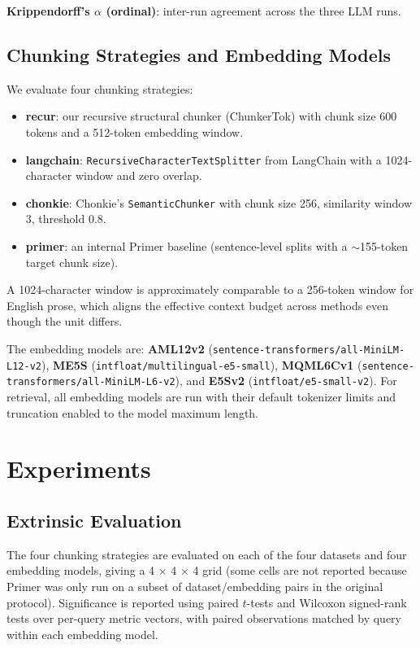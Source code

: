 \documentclass[conference]{IEEEtran}
\begin{document}
\textbf{Krippendorff's $\alpha$ (ordinal)}: inter-run agreement across the
three LLM runs.

\subsection{Chunking Strategies and Embedding Models}

We evaluate four chunking strategies:
\begin{itemize}
    \item \textbf{recur}: our recursive structural chunker (ChunkerTok)
    with chunk size 600 tokens and a 512-token embedding window.
    \item \textbf{langchain}: \texttt{RecursiveCharacterTextSplitter} from
    LangChain with a 1024-character window and zero overlap.
    \item \textbf{chonkie}: Chonkie's \texttt{SemanticChunker} with chunk
    size 256, similarity window 3, threshold 0.8.
    \item \textbf{primer}: an internal Primer baseline (sentence-level
    splits with a $\sim$155-token target chunk size).
\end{itemize}
A 1024-character window is approximately comparable to a 256-token window
for English prose, which aligns the effective context budget across methods
even though the unit differs.

The embedding models are:
\textbf{AML12v2} (\texttt{sentence-transformers/all-MiniLM-L12-v2}),
\textbf{ME5S} (\texttt{intfloat/multilingual-e5-small}),
\textbf{MQML6Cv1} (\texttt{sentence-transformers/all-MiniLM-L6-v2}), and
\textbf{E5Sv2} (\texttt{intfloat/e5-small-v2}). For retrieval, all
embedding models are run with their default tokenizer limits and truncation
enabled to the model maximum length.

\section{Experiments}

\subsection{Extrinsic Evaluation}

The four chunking strategies are evaluated on each of the four datasets and
four embedding models, giving a 4 $\times$ 4 $\times$ 4 grid (some cells
are not reported because Primer was only run on a subset of
dataset/embedding pairs in the original protocol). Significance is reported
using paired $t$-tests and Wilcoxon signed-rank tests over per-query
metric vectors, with paired observations matched by query within each
embedding model.
\end{document}
